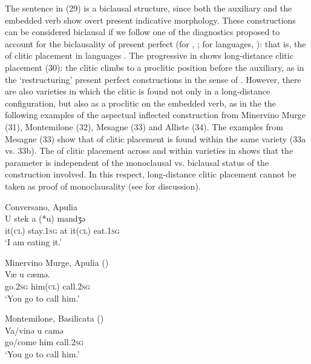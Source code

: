 \documentclass[output=paper]{langsci/langscibook}
\begin{document}
The sentence in (29) is a biclausal structure, since both the auxiliary and the embedded verb show overt present indicative morphology. These constructions can be considered biclausal if we follow one of the diagnostics proposed to account for the biclausality of present perfect (for , \citealt{Chomsky1957,Chomsky1981,Chomsky1995}; for  languages, \citealt{Kayne1993,Manzini2005,Manzini2007,Manzini2011Bio}): that is, the  of clitic placement in  languages \citep{Manzini2011Bio}. The progressive in  shows long-distance clitic placement (30): the clitic climbs to a proclitic position before the auxiliary, as in the ‘restructuring’ present perfect constructions in the sense of \citet{Rizzi1982}. However, there are also varieties in which the clitic is found not only in a long-distance configuration, but also as a proclitic on the embedded verb, as in the the following examples of the aspectual inflected construction from Minervino Murge (31), Montemilone (32), Mesagne (33) and Alliste (34). The examples from Mesagne (33) show that  of clitic placement is found within the same variety (33a vs. 33b). The  of clitic placement across and within varieties in  shows that the parameter is independent of the monoclausal vs. biclausal status of the construction involved. In this respect, long-distance clitic placement cannot be taken as proof of monoclausality (see \citealt{Manzini2011Bio,Manzini2017} for discussion).

\ea%
         Conversano, Apulia\label{ex:lorusso:30}\\
    \gll U   stek    a   (*u)  mandʒə \\
         it\textsc{(cl)} stay.\textsc{1sg} at  it\textsc{(cl)} eat.\textsc{1sg} \\
    \glt ‘I am eating it.’
\z

\ea%
         Minervino Murge, Apulia (\citealt{Manzini2005})\label{ex:lorusso:31}\\
    \gll Væ     u    cæmə. \\
         go.\textsc{2sg} him(\textsc{cl})   call.\textsc{2sg}    \\
    \glt ‘You go to call him.’ 
    \z

\ea%
         Montemilone, Basilicata (\citealt{Manzini2005})\label{ex:lorusso:32}\\
    \gll Va/vinə   u    camə         \\
         go/come  him   call.\textsc{2sg}\\
    \glt ‘You go to call him.’ 
    \z
\end{document}
